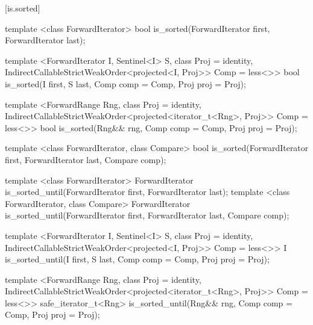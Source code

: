 [is.sorted]{}

%
\begin{removedblock}
\begin{itemdecl}
template <class ForwardIterator>
  bool is_sorted(ForwardIterator first, ForwardIterator last);
\end{itemdecl}
\end{removedblock}
\begin{addedblock}
\begin{itemdecl}
template <ForwardIterator I, Sentinel<I> S, class Proj = identity,
    IndirectCallableStrictWeakOrder<projected<I, Proj>> Comp = less<>>
  bool is_sorted(I first, S last, Comp comp = Comp{}, Proj proj = Proj{});

template <ForwardRange Rng, class Proj = identity,
    IndirectCallableStrictWeakOrder<projected<iterator_t<Rng>, Proj>> Comp = less<>>
  bool
    is_sorted(Rng&& rng, Comp comp = Comp{}, Proj proj = Proj{});
\end{itemdecl}
\end{addedblock}

\begin{itemdescr}
\pnum
\returns {}
\end{itemdescr}

\begin{removedblock}
%
\begin{itemdecl}
template <class ForwardIterator, class Compare>
  bool is_sorted(ForwardIterator first, ForwardIterator last,
    Compare comp);
\end{itemdecl}

\begin{itemdescr}
\pnum
\returns {}
\end{itemdescr}
\end{removedblock}

%
\begin{removedblock}
\begin{itemdecl}
template <class ForwardIterator>
  ForwardIterator is_sorted_until(ForwardIterator first, ForwardIterator last);
template <class ForwardIterator, class Compare>
  ForwardIterator is_sorted_until(ForwardIterator first, ForwardIterator last,
    Compare comp);
\end{itemdecl}
\end{removedblock}
\begin{addedblock}
\begin{itemdecl}
template <ForwardIterator I, Sentinel<I> S, class Proj = identity,
    IndirectCallableStrictWeakOrder<projected<I, Proj>> Comp = less<>>
  I is_sorted_until(I first, S last, Comp comp = Comp{}, Proj proj = Proj{});

template <ForwardRange Rng, class Proj = identity,
    IndirectCallableStrictWeakOrder<projected<iterator_t<Rng>, Proj>> Comp = less<>>
  safe_iterator_t<Rng>
    is_sorted_until(Rng&& rng, Comp comp = Comp{}, Proj proj = Proj{});
\end{itemdecl}
\end{addedblock}

